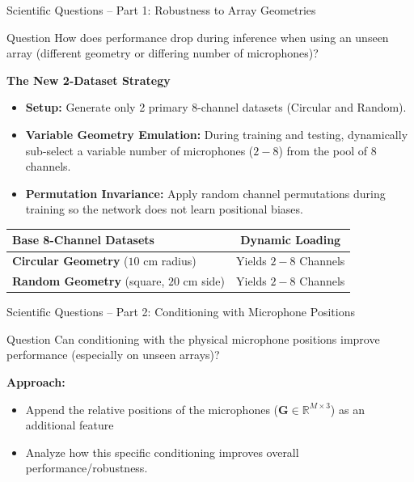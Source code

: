 \documentclass[8pt,hyperref={pdfpagelabels=true},xcolor=table,aspectratio=169]{beamer}
\begin{document}
\begin{frame}{Scientific Questions -- Part 1: Robustness to Array Geometries}
    \begin{block}{Question}
        How does performance drop during inference when using an unseen array (different geometry or differing number of microphones)?
    \end{block}
    \vspace{1em}
    \textbf{The New 2-Dataset Strategy}
    \begin{itemize}
        \item \textbf{Setup:} Generate only 2 primary 8-channel datasets (Circular and Random).
        \item \textbf{Variable Geometry Emulation:} During training and testing, dynamically sub-select a variable number of microphones ($2-8$) from the pool of 8 channels.
        \item \textbf{Permutation Invariance:} Apply random channel permutations during training so the network does not learn positional biases.
    \end{itemize}
    \vspace{1em}
    \begin{center}
        \begin{tabular}{l|c}
            \toprule
            \textbf{Base 8-Channel Datasets} & \textbf{Dynamic Loading} \\
            \midrule
            \textbf{Circular Geometry} ($10$ cm radius)      & Yields $2-8$ Channels                      \\
            \textbf{Random Geometry} (square, $20$ cm side)       & Yields $2-8$ Channels                      \\
            \bottomrule
        \end{tabular}
    \end{center}
\end{frame}

\begin{frame}{Scientific Questions -- Part 2: Conditioning with Microphone Positions}
    \begin{block}{Question}
        Can conditioning with the physical microphone positions improve performance (especially on unseen arrays)?
    \end{block}
    \vspace{1em}
    \textbf{Approach:}
    \begin{itemize}
        \item Append the relative positions of the microphones ($\mathbf{G} \in \mathbb{R}^{M \times 3}$) as an additional feature
        \item Analyze how this specific conditioning improves overall performance/robustness.
    \end{itemize}
\end{frame}
\end{document}

